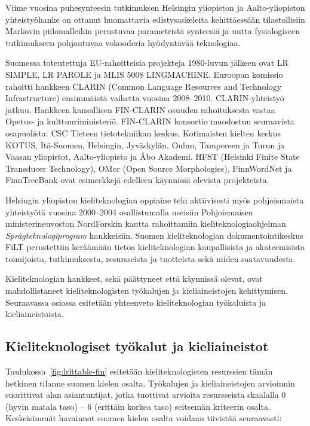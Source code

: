 \begin{multicols}{2}
Viime vuosina puhesynteesin tutkimuksen Helsingin yliopiston ja Aalto-yliopiston yhteistyöhanke on ottanut huomattavia edistysaskeleita kehittäessään tilastollisiin Markovin piilomalleihin perustuvaa parametristä synteesiä ja uutta fysiologiseen tutkimukseen pohjautuvaa vokooderia hyödyntävää teknologiaa.

Suomessa toteutettuja EU-rahoitteisia projekteja 1980-luvun jälkeen ovat LR SIMPLE, LR PAROLE ja MLIS 5008 LINGMACHINE. Euroopan komissio rahoitti hankkeen CLARIN (Common Language Resources and Technology Infrastructure) ensimmäistä vaihetta vuosina 2008--2010. CLARIN-yhteistyö jatkuu. Hankkeen kansallisen FIN-CLARIN osuuden rahoituksesta vastaa Opetus- ja kulttuuriministeriö. FIN-CLARIN konsortio muodostuu seuraavista osapuolista: CSC Tieteen tietotekniikan keskus, Kotimaisten kielten keskus KOTUS, Itä-Suomen, Helsingin, Jyväskylän, Oulun, Tampereen ja Turun ja Vaasan yliopistot, Aalto-yliopisto ja Åbo Akademi. HFST (Helsinki Finite State Transducer Technology), OMor (Open Source Morphologies), FinnWordNet ja FinnTreeBank ovat esimerkkejä edelleen käynnissä olevista projekteista.

Helsingin yliopiston kieliteknologian oppiaine teki aktiivisesti myös pohjoismaista yhteistyötä vuosina 2000--2004 osallistumalla useisiin Pohjoismaisen ministerineuvoston NordForskin kautta rahoittamiin kieliteknologiaohjelman \textit{Språgteknologiprogram} hankkeisiin. Suomen kieliteknologian dokumentointikeskus FiLT perustettiin keräämään tietoa kieliteknologian kaupallisista ja akateemisista toimijoista, tutkimuksesta, resursseista ja tuotteista sekä niiden saatavuudesta.

Kieliteknologian hankkeet, sekä päättyneet että käynnissä olevat, ovat mahdollistaneet kieliteknologisten työkalujen ja kieliaineistojen kehittymisen.  Seuraavassa osiossa esitetään yhteenveto kieliteknologian työkaluista ja kieliaineistoista.

\subsection{Kieliteknologiset työkalut ja kieliaineistot}

Taulukossa~\ref{fig:lrlttable-fin} esitetään kieliteknologisten resurssien tämän hetkinen tilanne suomen kielen osalta. Työkalujen ja kieliaineistojen arvioinnin suorittivat alan asiantuntijat, jotka tuottivat arvioita resursseista skaalalla 0 (hyvin matala taso) -- 6 (erittäin korkea taso) seitsemän kriteerin osalta.  Keskeisimmät havainnot suomen kielen osalta voidaan tiivistää seuraavasti:


\end{multicols}
